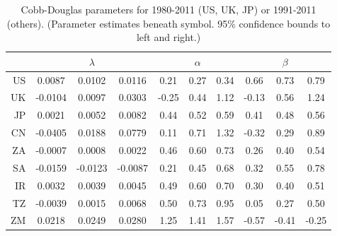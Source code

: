 \documentclass[preprint,authoryear,12pt]{elsarticle}\usepackage{graphicx, color}
\begin{document}
\begin{table}[ht]
\begin{center}
\caption{Cobb-Douglas parameters for 1980-2011 (US, UK, JP) or 1991-2011 (others). (Parameter estimates beneath symbol. 95\% confidence bounds to left and right.)}
\begin{tabular}{r|ccc|ccc|ccc}
  \hline
 &   & $\lambda$ &   &   & $\alpha$ &   &   & $\beta$ &   \\ 
  \hline
US & 0.0087 & 0.0102 & 0.0116 & 0.21 & 0.27 & 0.34 & 0.66 & 0.73 & 0.79 \\ 
  UK & -0.0104 & 0.0097 & 0.0303 & -0.25 & 0.44 & 1.12 & -0.13 & 0.56 & 1.24 \\ 
  JP & 0.0021 & 0.0052 & 0.0082 & 0.44 & 0.52 & 0.59 & 0.41 & 0.48 & 0.56 \\ 
  CN & -0.0405 & 0.0188 & 0.0779 & 0.11 & 0.71 & 1.32 & -0.32 & 0.29 & 0.89 \\ 
  ZA & -0.0007 & 0.0008 & 0.0022 & 0.46 & 0.60 & 0.73 & 0.26 & 0.40 & 0.54 \\ 
  SA & -0.0159 & -0.0123 & -0.0087 & 0.21 & 0.45 & 0.68 & 0.32 & 0.55 & 0.78 \\ 
  IR & 0.0032 & 0.0039 & 0.0045 & 0.49 & 0.60 & 0.70 & 0.30 & 0.40 & 0.51 \\ 
  TZ & -0.0039 & 0.0015 & 0.0068 & 0.50 & 0.73 & 0.95 & 0.05 & 0.27 & 0.50 \\ 
  ZM & 0.0218 & 0.0249 & 0.0280 & 1.25 & 1.41 & 1.57 & -0.57 & -0.41 & -0.25 \\ 
   \hline
\end{tabular}
\end{center}
\end{table}
\end{document}
